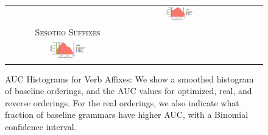 \documentclass[11pt,letterpaper]{article}
\begin{document}
\begin{figure}
\begin{tabular}{cccccc}
        &
            \includegraphics[width=0.3\textwidth]{figures/sesotho_prefixes/suffixes-byMorphemes-auc-hist-heldout-Coarse-FineSurprisal-optimized.pdf}
            \\
            \textsc{Sesotho Suffixes} \\
            \includegraphics[width=0.3\textwidth]{figures/sesotho_suffixes/suffixes-byMorphemes-auc-hist-heldout-Coarse-FineSurprisal-optimized.pdf}
    \end{tabular}

    
    \caption{AUC Histograms for Verb Affixes: We show a smoothed histogram of baseline orderings, and the AUC values for optimized, real, and reverse orderings. For the real orderings, we also indicate what fraction of baseline grammars have higher AUC, with a Binomial confidence interval. }
    \label{fig:auc_verbs}
\end{figure}
\end{document}
